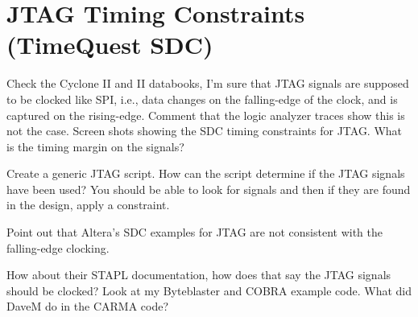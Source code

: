 \documentclass[10pt,twoside]{article}
\begin{document}
\section{JTAG Timing Constraints (TimeQuest SDC)}

Check the Cyclone II and II databooks, I'm sure that JTAG signals
are supposed to be clocked like SPI, i.e., data changes on the
falling-edge of the clock, and is captured on the rising-edge.
Comment that the logic analyzer
traces show this is not the case. Screen shots showing the
SDC timing constraints for JTAG. What is the timing margin
on the signals? 

Create a generic JTAG script. How can the script determine if the
JTAG signals have been used? You should be able to look for signals
and then if they are found in the design, apply a constraint.

Point out that Altera's SDC examples for JTAG are not consistent
with the falling-edge clocking.

How about their STAPL documentation, how does that say the
JTAG signals should be clocked? Look at my Byteblaster and
COBRA example code. What did DaveM do in the CARMA code?


\clearpage
%



\end{document}
